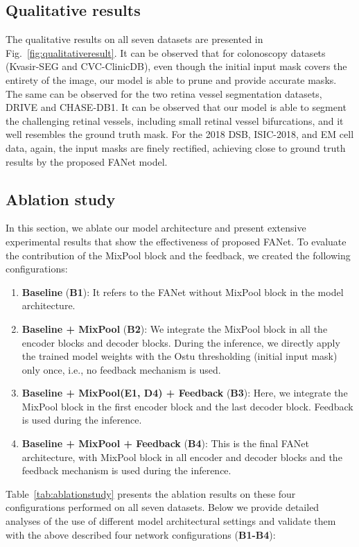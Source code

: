 \documentclass[journal]{IEEEtran}
\begin{document}
\subsection{Qualitative results}
The qualitative results on all seven datasets are presented in Fig.~\ref{fig:qualitativeresult}. It can be observed that for colonoscopy datasets (Kvasir-SEG and CVC-ClinicDB), even though the initial input mask covers the entirety of the image, our model is able to prune and provide accurate masks. The same can be observed for the two retina vessel segmentation datasets, DRIVE and CHASE-DB1. It can be observed that our model is able to segment the challenging retinal vessels, including small retinal vessel bifurcations, and it well resembles the ground truth mask. For the 2018 DSB, ISIC-2018, and EM cell data, again, the input masks are finely rectified, achieving close to ground truth results by the proposed FANet model.

\subsection{Ablation study}
\label{ablationstudy}
In this section, we ablate our model architecture and present extensive experimental results that show the effectiveness of proposed FANet.  To evaluate the contribution of the MixPool block and the feedback, we created the following configurations:
\begin{enumerate}
    \item \textbf{Baseline} (\textbf{B1}): It refers to the FANet without MixPool block in the model architecture.
    
    \item \textbf{Baseline + MixPool} (\textbf{B2}): We integrate the MixPool block in all the encoder blocks and decoder blocks. During the inference, we directly apply the trained model weights with the Ostu thresholding (initial input mask) only once, i.e., no feedback mechanism is used.
    
    \item \textbf{Baseline + MixPool(E1, D4) + Feedback} (\textbf{B3}): Here, we integrate the MixPool block in the first encoder block and the last decoder block. Feedback is used during the inference.
    
    \item \textbf{Baseline + MixPool + Feedback} (\textbf{B4}): This is the final FANet architecture, with MixPool block in all encoder and decoder blocks and the feedback mechanism is used during the inference.
    
\end{enumerate}
Table~\ref{tab:ablationstudy} presents the ablation results on these four configurations performed on all seven datasets. Below we provide detailed analyses of the use of different model architectural settings and validate them with the above described four network configurations (\textbf{B1-B4}):
\end{document}
